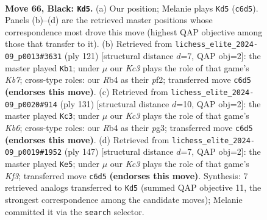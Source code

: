 \documentclass[11pt]{article}
\begin{document}
\clearpage

\begin{figure}[p]\centering
\begin{subfigure}{0.46\textwidth}\centering
\resizebox{\linewidth}{!}{%
\newchessgame
\chessboard[
  setfen={8/6Q1/2k3P1/4P2P/1r6/8/2K5/8 b - - 0 66},
  showmover=false,
  pgfstyle=straightmove, color=movearrow, markmove={c6-d5}
]}
\caption{}
\end{subfigure}\hfill
\begin{subfigure}{0.46\textwidth}\centering
\resizebox{\linewidth}{!}{%
\newchessgame
\chessboard[
  setfen={8/1Q6/1P6/8/8/6P1/1k3P2/6K1 b - - 0 61},
  showmover=false,
  pgfstyle=straightmove, color=movearrow, markmove={b2-b1}
]}
\caption{}
\end{subfigure}
\\[4pt]
\begin{subfigure}{0.46\textwidth}\centering
\resizebox{\linewidth}{!}{%
\newchessgame
\chessboard[
  setfen={8/8/7Q/7P/8/1k3PPK/8/8 b - - 0 66},
  showmover=false,
  pgfstyle=straightmove, color=movearrow, markmove={b3-c3}
]}
\caption{}
\end{subfigure}\hfill
\begin{subfigure}{0.46\textwidth}\centering
\resizebox{\linewidth}{!}{%
\newchessgame
\chessboard[
  setfen={8/8/5k2/7P/6Q1/5PP1/2K5/8 b - - 10 74},
  showmover=false,
  pgfstyle=straightmove, color=movearrow, markmove={f6-e5}
]}
\caption{}
\end{subfigure}
\caption{\textbf{Move 66, Black: \texttt{Kd5}.} (a) Our position; Melanie plays \texttt{Kd5} (\texttt{c6d5}). Panels (b)--(d) are the retrieved master positions whose correspondence most drove this move (highest QAP objective among those that transfer to it). (b) Retrieved from \texttt{lichess\_elite\_2024-09\_p0013\#3631} (ply 121) [structural distance $d$=7, QAP obj=2]: the master played \texttt{Kb1}; under $\mu$ our \emph{Kc3} plays the role of that game's \emph{Kb7}; cross-type roles: our \emph{R}b4 as their \emph{p}f2; transferred move \texttt{c6d5} \textbf{(endorses this move)}. (c) Retrieved from \texttt{lichess\_elite\_2024-09\_p0020\#914} (ply 131) [structural distance $d$=10, QAP obj=2]: the master played \texttt{Kc3}; under $\mu$ our \emph{Kc3} plays the role of that game's \emph{Kb6}; cross-type roles: our \emph{R}b4 as their \emph{p}g3; transferred move \texttt{c6d5} \textbf{(endorses this move)}. (d) Retrieved from \texttt{lichess\_elite\_2024-09\_p0019\#1952} (ply 147) [structural distance $d$=7, QAP obj=2]: the master played \texttt{Ke5}; under $\mu$ our \emph{Kc3} plays the role of that game's \emph{Kf3}; transferred move \texttt{c6d5} \textbf{(endorses this move)}. Synthesis: 7 retrieved analogs transferred to \texttt{Kd5} (summed QAP objective 11, the strongest correspondence among the candidate moves); Melanie committed it via the \texttt{search} selector.}
\label{fig:thought-m131}
\end{figure}
\end{document}
